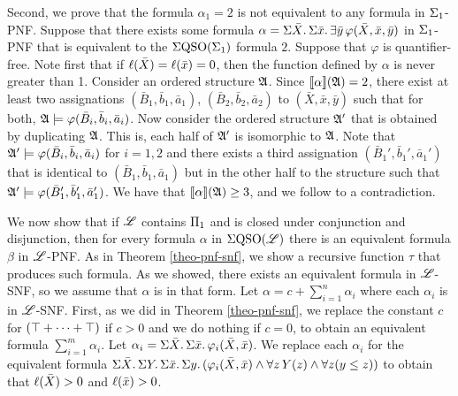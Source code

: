 \vspace{1em}
Second, we prove that the formula $\alpha_{1} = 2$ is not equivalent to any formula in $\Sigma_{1}$-PNF. Suppose that there exists some formula $\alpha = \Sigma{\bar{X}}.\,\Sigma{\bar{x}}.\,\exists\bar{y}\, \varphi(\bar{X},\bar{x},\bar{y})$ in $\Sigma_{1}$-PNF that is equivalent to the $\Sigma{\rm QSO}(\Sigma_{1})$ formula $2$. Suppose that $\varphi$ is quantifier-free. Note first that if $\ell(\bar{X}) = \ell(\bar{x}) = 0$, then the function defined by $\alpha$ is never greater than 1. Consider an ordered structure $\mathfrak{A}$. Since ${\llbracket{}{\alpha}\rrbracket}(\mathfrak{A}) = 2$, there exist at least two assignations $(\bar{B}_1,\bar{b}_1,\bar{a}_1)$, $(\bar{B}_2,\bar{b}_2,\bar{a}_2)$ to $(\bar{X},\bar{x},\bar{y})$ such that for both, $\mathfrak{A}\models\varphi(\bar{B}_i,\bar{b}_i,\bar{a}_i)$. Now consider the ordered structure $\mathfrak{A}'$ that is obtained by duplicating $\mathfrak{A}$. This is, each half of $\mathfrak{A}'$ is isomorphic to $\mathfrak{A}$. Note that $\mathfrak{A}'\models\varphi(\bar{B}_i,\bar{b}_i,\bar{a}_i)$ for $i = 1,2$ and there exists a third assignation $(\bar{B}_1',\bar{b}_1',\bar{a}_1')$ that is identical to $(\bar{B}_1,\bar{b}_1,\bar{a}_1)$ but in the other half to the structure such that $\mathfrak{A}'\models\varphi(\bar{B}_1',\bar{b}_1',\bar{a}_1')$. We have that ${\llbracket{}{\alpha}\rrbracket}(\mathfrak{A}) \geq 3$, and we follow to a contradiction.

\vspace{1em}
We now show that if $\mathscr{L}$ contains $\Pi_{1}$ and is closed under conjunction and disjunction, then for every formula $\alpha$ in $\Sigma{\rm QSO}(\mathscr{L})$ there is an equivalent formula $\beta$ in $\mathscr{L}$-PNF. As in Theorem \ref{theo-pnf-snf}, we show a recursive function $\tau$ that produces such formula. As we showed, there exists an equivalent formula in $\mathscr{L}$-SNF, so we assume that $\alpha$ is in that form. Let $\alpha = c + \sum_{i = 1}^n \alpha_i$ where each $\alpha_i$ is in $\mathscr{L}$-SNF. First, as we did in Theorem \ref{theo-pnf-snf}, we replace the constant $c$ for $(\top + \cdots + \top)$ if $c > 0$ and we do nothing if $c = 0$, to obtain an equivalent formula $\sum_{i = 1}^m \alpha_i$. Let $\alpha_i = \Sigma{\bar{X}}.\,\Sigma{\bar{x}}.\,\varphi_i(\bar{X},\bar{x})$. We replace each $\alpha_i$ for the equivalent formula $\Sigma{\bar{X}}.\,\Sigma{Y}.\,\Sigma{\bar{x}}.\,\Sigma{y}.\,(\varphi_i(\bar{X},\bar{x})\wedge\forall z\,Y(z) \wedge \forall z(y \leq z))$ to obtain that $\ell(\bar{X}) > 0$ and $\ell(\bar{x}) > 0$. 

